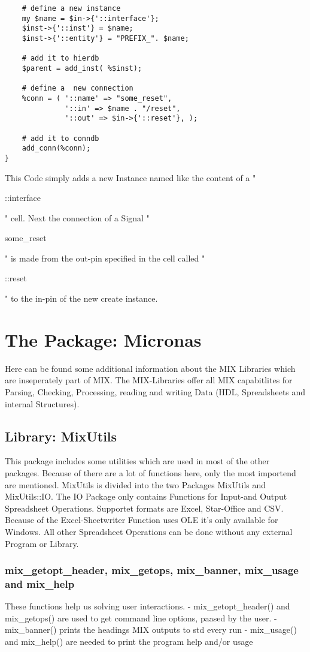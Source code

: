 \documentclass[a4paper,12pt]{article}
\begin{document}
{\begin{verbatim}
    # define a new instance
    my $name = $in->{'::interface'};
    $inst->{'::inst'} = $name;
    $inst->{'::entity'} = "PREFIX_". $name;

    # add it to hierdb
    $parent = add_inst( %$inst);

    # define a  new connection
    %conn = ( '::name' => "some_reset",
              '::in' => $name . "/reset",
              '::out' => $in->{'::reset'}, );

    # add it to conndb
    add_conn(%conn);
}
\end{verbatim}
This Code simply adds a new Instance named like the content of a "\begin{tt}::interface\end{tt}" cell. Next the connection of a Signal "\begin{tt}some\_reset\end{tt}" is made from the out-pin specified in the cell called "\begin{tt}::reset\end{tt}" to the in-pin of the new create instance.



\section{The Package: Micronas}
Here can be found some additional information about the MIX Libraries which are inseperately part of MIX. The MIX-Libraries offer all MIX capabitlites for Parsing, Checking, Processing, reading and writing Data (HDL, Spreadsheets and internal Structures).


\subsection{Library: MixUtils}
This package includes some utilities which are used in most of the other packages. Because of there are a lot of functions here, only the most importend are mentioned. MixUtils is divided into the two Packages MixUtils and MixUtils::IO. The IO Package only contains Functions for Input-and Output Spreadsheet Operations. Supportet formats are Excel, Star-Office and CSV. Because of the Excel-Sheetwriter Function uses OLE it's only available for Windows. All other Spreadsheet Operations can be done without any external Program or Library.


\subsubsection{mix\_getopt\_header, mix\_getops, mix\_banner, mix\_usage and mix\_help}
These functions help us solving user interactions.\newline
\hspace*{10mm}- mix\_getopt\_header() and mix\_getops() are used to get command line options, paased by the user.
\hspace*{10mm}- mix\_banner() prints the headings MIX outputs to std every run
\hspace*{10mm}- mix\_usage() and mix\_help() are needed to print the program help and/or usage


}
\end{document}
